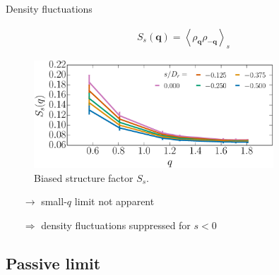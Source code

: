 \documentclass{beamer}
\begin{document}
\begin{frame}{Density fluctuations}

\vspace{-10pt}
\begin{align*}
S_s(\boldsymbol{q}) = \left<\rho_{\boldsymbol{q}} \rho_{-\boldsymbol{q}}\right>_s
\end{align*}

\begin{figure}
\centering
\includegraphics[width=0.80\textwidth]{S_Nn1000_Dk6500_Ll5000_NCo1000.eps}
\caption{Biased structure factor $S_s$. }
\end{figure}

\begin{itemize}
  \item[$\rightarrow$] small-$q$ limit not apparent
  \item[$\Rightarrow$] density fluctuations suppressed for $s < 0$
\end{itemize}

\end{frame}

\subsection{Passive limit}
\end{document}
